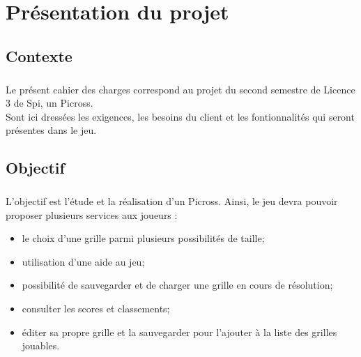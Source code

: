 
\newcommand{\titre}{{\Huge Cahier des charges}\\Groupe B}
\newcommand{\titrehead}{Cahier des charges}

%


\maketitle
\tableofcontents



\chapter{Présentation du projet}


\section{Contexte}
        \paragraph*{}
        Le présent cahier des charges correspond au projet du second semestre de Licence 3 de Spi, un Picross.\\
        Sont ici dressées les exigences, les besoins du client et les fontionnalités qui seront présentes dans le jeu.


\section{Objectif}
        \paragraph*{}
        L'objectif est l'étude et la réalisation d'un Picross. Ainsi, le jeu devra pouvoir proposer plusieurs services aux joueurs :
        \begin{itemize}
                \item le choix d'une grille parmi plusieurs possibilités de taille;
                \item utilisation d'une aide au jeu;
                \item possibilité de sauvegarder et de charger une grille en cours de résolution;
                \item consulter les scores et classements;
                \item éditer sa propre grille et la sauvegarder pour l'ajouter à la liste des grilles jouables.
        \end{itemize}


